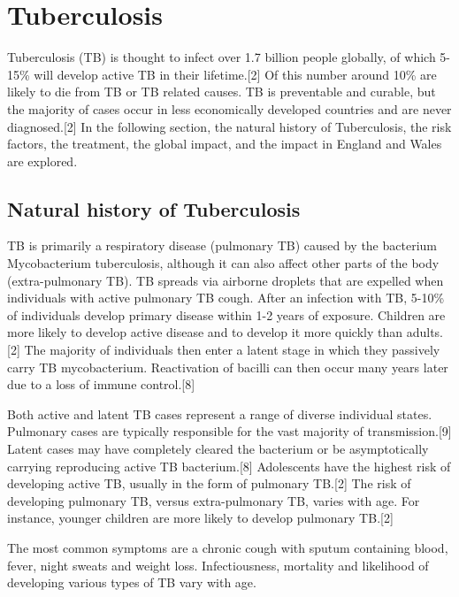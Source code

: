 \documentclass[11pt,twoside]{bristolthesis}
\begin{document}
  \hypertarget{tuberculosis}{%
  \section{Tuberculosis}\label{tuberculosis}}
  
  Tuberculosis (TB) is thought to infect over 1.7 billion people globally, of which 5-15\% will develop active TB in their lifetime.{[}2{]} Of this number around 10\% are likely to die from TB or TB related causes. TB is preventable and curable, but the majority of cases occur in less economically developed countries and are never diagnosed.{[}2{]} In the following section, the natural history of Tuberculosis, the risk factors, the treatment, the global impact, and the impact in England and Wales are explored.
  
  \hypertarget{natural-history-of-tuberculosis}{%
  \subsection{Natural history of Tuberculosis}\label{natural-history-of-tuberculosis}}
  
  TB is primarily a respiratory disease (pulmonary TB) caused by the bacterium Mycobacterium tuberculosis, although it can also affect other parts of the body (extra-pulmonary TB). TB spreads via airborne droplets that are expelled when individuals with active pulmonary TB cough. After an infection with TB, 5-10\% of individuals develop primary disease within 1-2 years of exposure. Children are more likely to develop active disease and to develop it more quickly than adults.{[}2{]} The majority of individuals then enter a latent stage in which they passively carry TB mycobacterium. Reactivation of bacilli can then occur many years later due to a loss of immune control.{[}8{]}
  
  Both active and latent TB cases represent a range of diverse individual states. Pulmonary cases are typically responsible for the vast majority of transmission.{[}9{]} Latent cases may have completely cleared the bacterium or be asymptotically carrying reproducing active TB bacterium.{[}8{]} Adolescents have the highest risk of developing active TB, usually in the form of pulmonary TB.{[}2{]} The risk of developing pulmonary TB, versus extra-pulmonary TB, varies with age. For instance, younger children are more likely to develop pulmonary TB.{[}2{]}
  
  The most common symptoms are a chronic cough with sputum containing blood, fever, night sweats and weight loss. Infectiousness, mortality and likelihood of developing various types of TB vary with age.
  
\end{document}
